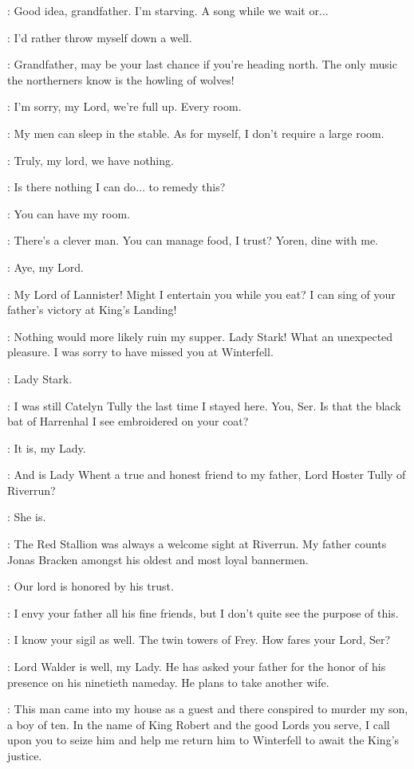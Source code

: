 \MARILLION: Good idea, grandfather. I'm starving. A song while we wait or$\ldots$

\RODRIK: I'd rather throw myself down a well. 

\MARILLION: Grandfather, may be your last chance if you're heading north. The only music the northerners know is the howling of wolves! 


\MARSHAHEDDLE: I'm sorry, my Lord, we're full up. Every room. 

\TYRION: My men can sleep in the stable. As for myself, I don't require a large room. 

\MARSHAHEDDLE: Truly, my lord, we have nothing. 

\TYRION: Is there nothing I can do$\ldots$ to remedy this? 

\BRONN: You can have my room. 

\TYRION:  There's a clever man.  You can manage food, I trust? Yoren, dine with me. 

\YOREN: Aye, my Lord. 

\MARILLION: My Lord of Lannister! Might I entertain you while you eat? I can sing of your father's victory at King's Landing! 

\TYRION: Nothing would more likely ruin my supper. Lady Stark! What an unexpected pleasure. I was sorry to have missed you at Winterfell. 

\MARSHAHEDDLE: Lady Stark. 

\CATELYN:  I was still Catelyn Tully the last time I stayed here. You, Ser. Is that the black bat of Harrenhal I see embroidered on your coat? 

\KNIGHTa: It is, my Lady. 

\CATELYN: And is Lady Whent a true and honest friend to my father, Lord Hoster Tully of Riverrun? 

\KNIGHTa: She is. 

\CATELYN: The Red Stallion was always a welcome sight at Riverrun. My father counts Jonas Bracken amongst his oldest and most loyal bannermen. 

\KNIGHTb: Our lord is honored by his trust. 

\TYRION: I envy your father all his fine friends, but I don't quite see the purpose of this. 

\CATELYN: I know your sigil as well. The twin towers of Frey. How fares your Lord, Ser? 

\KNIGHTc: Lord Walder is well, my Lady. He has asked your father for the honor of his presence on his ninetieth nameday. He plans to take another wife. 

\CATELYN: This man came into my house as a guest and there conspired to murder my son, a boy of ten. In the name of King Robert and the good Lords you serve, I call upon you to seize him and help me return him to Winterfell to await the King's justice. 



